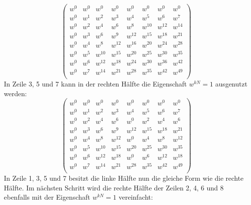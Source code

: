 \begin{equation*}
\left( \begin{array}{cccccccc}
w^{0} & w^{0} & w^{0} & w^{0} & w^{0} & w^{0} & w^{0} & w^{0}\\
w^{0} & w^{1} & w^{2} & w^{3} & w^{4} & w^{5} & w^{6} & w^{7}\\
w^{0} & w^{2} & w^{4} & w^{6} & w^{8} & w^{10} & w^{12} & w^{14}\\
w^{0} & w^{3} & w^{6} & w^{9} & w^{12} & w^{15} & w^{18} & w^{21}\\
w^{0} & w^{4} & w^{8} & w^{12} & w^{16} & w^{20} & w^{24} & w^{28}\\
w^{0} & w^{5} & w^{10} & w^{15} & w^{20} & w^{25} & w^{30} & w^{35}\\
w^{0} & w^{6} & w^{12} & w^{18} & w^{24} & w^{30} & w^{36} & w^{42}\\
w^{0} & w^{7} & w^{14} & w^{21} & w^{28} & w^{35} & w^{42} & w^{49}\\
\end{array} \right)
\end{equation*}
In Zeile 3, 5 und 7 kann in der rechten Hälfte die Eigenschaft $w^{kN} = 1$ ausgenutzt werden:
\begin{equation*}
\left( \begin{array}{cccccccc}
w^{0} & w^{0} & w^{0} & w^{0} & w^{0} & w^{0} & w^{0} & w^{0}\\
w^{0} & w^{1} & w^{2} & w^{3} & w^{4} & w^{5} & w^{6} & w^{7}\\
w^{0} & w^{2} & w^{4} & w^{6} & w^{0} & w^{2} & w^{4} & w^{6}\\
w^{0} & w^{3} & w^{6} & w^{9} & w^{12} & w^{15} & w^{18} & w^{21}\\
w^{0} & w^{4} & w^{8} & w^{12} & w^{0} & w^{4} & w^{8} & w^{12}\\
w^{0} & w^{5} & w^{10} & w^{15} & w^{20} & w^{25} & w^{30} & w^{35}\\
w^{0} & w^{6} & w^{12} & w^{18} & w^{0} & w^{6} & w^{12} & w^{18}\\
w^{0} & w^{7} & w^{14} & w^{21} & w^{28} & w^{35} & w^{42} & w^{49}\\
\end{array} \right)
\end{equation*}
In Zeile 1, 3, 5 und 7 besitzt die linke Hälfte nun die gleiche Form wie die rechte Hälfte.
Im nächsten Schritt wird die rechte Hälfte der Zeilen 2, 4, 6 und 8 ebenfalls mit der Eigenschaft $w^{kN} = 1$ vereinfacht:

